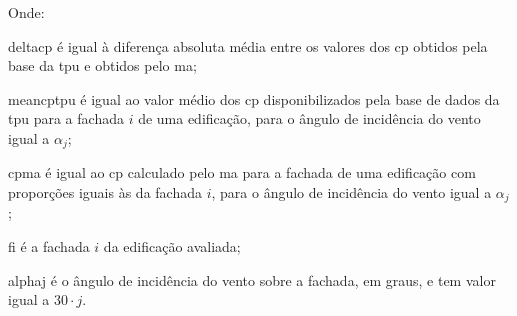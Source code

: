 \documentclass[brazil,hardcopy,openany]{ufscthesis} %
\begin{document}
Onde:

\gls{deltacp} é igual à diferença absoluta média entre os valores dos \acrshort{cp} obtidos pela base da \acrshort{tpu} e obtidos pelo \acrlong{ma};

\gls{meancptpu} é igual ao valor médio dos \acrshort{cp} disponibilizados pela base de dados da \acrshort{tpu} para a fachada $i$ de uma edificação, para o ângulo de incidência do vento igual a $\alpha_j$;

\gls{cpma} é igual ao \acrshort{cp} calculado pelo \acrlong{ma} para a fachada de uma edificação com proporções iguais às da fachada $i$, para o ângulo de incidência do vento igual a $\alpha_j$;

\gls{fi} é a fachada $i$ da edificação avaliada;

\gls{alphaj} é o ângulo de incidência do vento  sobre a fachada, em graus, e tem valor igual a $30 \cdot j$.	
\\

\end{document}
